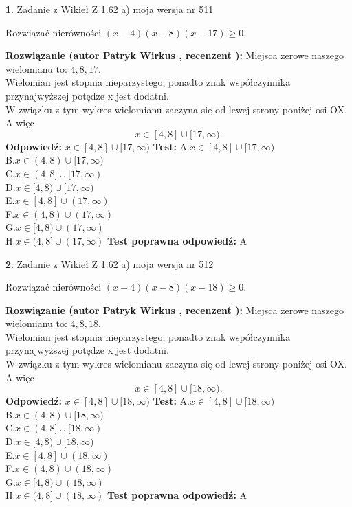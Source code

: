\documentclass[12pt, a4paper]{article}
\theoremstyle{definition} %
\newtheorem{zad}{}
\newcommand{\zadStart}[1]{\begin{zad}#1\newline}
\newcommand{\zadStop}{\end{zad}}
\newcommand{\rozwStart}[2]{\noindent \textbf{Rozwiązanie (autor #1 , recenzent #2): }\newline}
\newcommand{\rozwStop}{\newline}
\newcommand{\odpStart}{\noindent \textbf{Odpowiedź:}\newline}
\newcommand{\odpStop}{\newline}
\newcommand{\testStart}{\noindent \textbf{Test:}\newline}
\newcommand{\testStop}{\newline}
\newcommand{\kluczStart}{\noindent \textbf{Test poprawna odpowiedź:}\newline}
\newcommand{\kluczStop}{\newline}
\begin{document}
\zadStart{Zadanie z Wikieł Z 1.62 a) moja wersja nr 511}

Rozwiązać nierówności $(x-4)(x-8)(x-17)\ge0$.
\zadStop
\rozwStart{Patryk Wirkus}{}
Miejsca zerowe naszego wielomianu to: $4, 8, 17$.\\
Wielomian jest stopnia nieparzystego, ponadto znak współczynnika przy\linebreak najwyższej potędze x jest dodatni.\\ W związku z tym wykres wielomianu zaczyna się od lewej strony poniżej osi OX. A więc $$x \in [4,8] \cup [17,\infty).$$
\rozwStop
\odpStart
$x \in [4,8] \cup [17,\infty)$
\odpStop
\testStart
A.$x \in [4,8] \cup [17,\infty)$\\
B.$x \in (4,8) \cup [17,\infty)$\\
C.$x \in (4,8] \cup [17,\infty)$\\
D.$x \in [4,8) \cup [17,\infty)$\\
E.$x \in [4,8] \cup (17,\infty)$\\
F.$x \in (4,8) \cup (17,\infty)$\\
G.$x \in [4,8) \cup (17,\infty)$\\
H.$x \in (4,8] \cup (17,\infty)$
\testStop
\kluczStart
A
\kluczStop



\zadStart{Zadanie z Wikieł Z 1.62 a) moja wersja nr 512}

Rozwiązać nierówności $(x-4)(x-8)(x-18)\ge0$.
\zadStop
\rozwStart{Patryk Wirkus}{}
Miejsca zerowe naszego wielomianu to: $4, 8, 18$.\\
Wielomian jest stopnia nieparzystego, ponadto znak współczynnika przy\linebreak najwyższej potędze x jest dodatni.\\ W związku z tym wykres wielomianu zaczyna się od lewej strony poniżej osi OX. A więc $$x \in [4,8] \cup [18,\infty).$$
\rozwStop
\odpStart
$x \in [4,8] \cup [18,\infty)$
\odpStop
\testStart
A.$x \in [4,8] \cup [18,\infty)$\\
B.$x \in (4,8) \cup [18,\infty)$\\
C.$x \in (4,8] \cup [18,\infty)$\\
D.$x \in [4,8) \cup [18,\infty)$\\
E.$x \in [4,8] \cup (18,\infty)$\\
F.$x \in (4,8) \cup (18,\infty)$\\
G.$x \in [4,8) \cup (18,\infty)$\\
H.$x \in (4,8] \cup (18,\infty)$
\testStop
\kluczStart
A
\kluczStop
\end{document}
